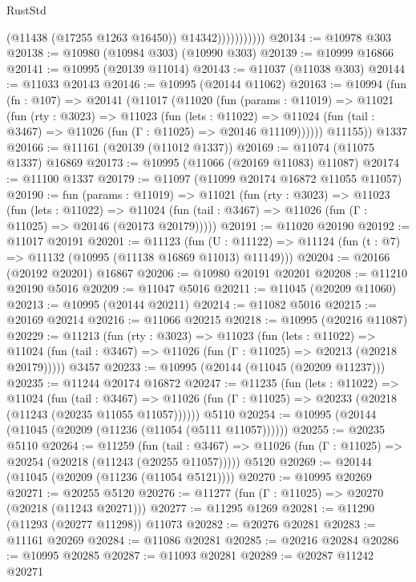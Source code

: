 \begin{lexlean}{RustStd}
\begin{coremodule}
                          (@11438 (@17255 @1263 @16450))
                          @14342)))))))))))
@20134 := @10978 @303
@20138 := @10980 (@10984 @303) (@10990 @303)
@20139 := @10999 @16866
@20141 := @10995 (@20139 @11014)
@20143 := @11037 (@11038 @303)
@20144 := @11033 @20143
@20146 := @10995 (@20144 @11062)
@20163 := @10994
    (fun (fn : @107) =>
    @20141
      (@11017
        (@11020
          (fun (params : @11019) =>
          @11021
            (fun (rty : @3023) =>
            @11023
              (fun (lets : @11022) =>
              @11024 (fun (tail : @3467) => @11026 (fun (Γ : @11025) => @20146 @11109))))))
        @11155))
    @1337
@20166 := @11161 (@20139 (@11012 @1337))
@20169 := @11074 (@11075 @1337) @16869
@20173 := @10995 (@11066 (@20169 @11083) @11087)
@20174 := @11100 @1337
@20179 := @11097 (@11099 @20174 @16872 @11055 @11057)
@20190 := fun (params : @11019) =>
  @11021
    (fun (rty : @3023) =>
    @11023
      (fun (lets : @11022) =>
      @11024 (fun (tail : @3467) => @11026 (fun (Γ : @11025) => @20146 (@20173 @20179)))))
@20191 := @11020 @20190
@20192 := @11017 @20191
@20201 := @11123
    (fun (U : @11122) => @11124 (fun (t : @7) => @11132 (@10995 (@11138 @16869 @11013) @11149)))
@20204 := @20166 (@20192 @20201) @16867
@20206 := @10980 @20191 @20201
@20208 := @11210 @20190 @5016
@20209 := @11047 @5016
@20211 := @11045 (@20209 @11060)
@20213 := @10995 (@20144 @20211)
@20214 := @11082 @5016
@20215 := @20169 @20214
@20216 := @11066 @20215
@20218 := @10995 (@20216 @11087)
@20229 := @11213
    (fun (rty : @3023) =>
    @11023
      (fun (lets : @11022) =>
      @11024 (fun (tail : @3467) => @11026 (fun (Γ : @11025) => @20213 (@20218 @20179)))))
    @3457
@20233 := @10995 (@20144 (@11045 (@20209 @11237)))
@20235 := @11244 @20174 @16872
@20247 := @11235
    (fun (lets : @11022) =>
    @11024
      (fun (tail : @3467) =>
      @11026 (fun (Γ : @11025) => @20233 (@20218 (@11243 (@20235 @11055 @11057))))))
    @5110
@20254 := @10995 (@20144 (@11045 (@20209 (@11236 (@11054 (@5111 @11057))))))
@20255 := @20235 @5110
@20264 := @11259
    (fun (tail : @3467) => @11026 (fun (Γ : @11025) => @20254 (@20218 (@11243 (@20255 @11057)))))
    @5120
@20269 := @20144 (@11045 (@20209 (@11236 (@11054 @5121))))
@20270 := @10995 @20269
@20271 := @20255 @5120
@20276 := @11277 (fun (Γ : @11025) => @20270 (@20218 (@11243 @20271)))
@20277 := @11295 @1269
@20281 := @11290 (@11293 (@20277 @11298)) @11073
@20282 := @20276 @20281
@20283 := @11161 @20269
@20284 := @11086 @20281
@20285 := @20216 @20284
@20286 := @10995 @20285
@20287 := @11093 @20281
@20289 := @20287 @11242 @20271

\end{coremodule}
\end{lexlean}

